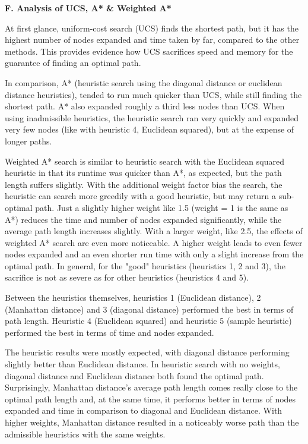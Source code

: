 \documentclass[12pt, letterpaper]{article}
\begin{document}
\medskip

\pagebreak %

\noindent \textbf{F. Analysis of UCS, A* \& Weighted A*}

At first glance, uniform-cost search (UCS) finds the shortest path, but it has the highest number of nodes expanded and time taken by far, compared to the other methods. This provides evidence how UCS sacrifices speed and memory for the guarantee of finding an optimal path.

In comparison, A* (heuristic search using the diagonal distance or euclidean distance heuristics),  tended to run much quicker than UCS, while still finding the shortest path. A* also expanded roughly a third less nodes than UCS. When using inadmissible heuristics, the heuristic search ran very quickly and expanded very few nodes (like with heuristic 4, Euclidean squared), but at the expense of longer paths.

Weighted A* search is similar to heuristic search with the Euclidean squared heuristic in that its runtime was quicker than A*, as expected, but the path length suffers slightly. With the additional weight factor bias the search, the heuristic can search more greedily with a good heuristic, but may return a sub-optimal path. Just a slightly higher weight like 1.5 (weight = 1 is the same as A*) reduces the time and number of nodes expanded significantly, while the average path length increases slightly. With a larger weight, like 2.5, the effects of weighted A* search are even more noticeable. A higher weight leads to even fewer nodes expanded and an even shorter run time with only a slight increase from the optimal path. In general, for the "good" heuristics (heuristics 1, 2 and 3), the sacrifice is not as severe as for other heuristics (heuristics 4 and 5). \newline

Between the heuristics themselves, heuristics 1 (Euclidean distance), 2 (Manhattan distance) and 3 (diagonal distance) performed the best in terms of path length. Heuristic 4 (Euclidean squared) and heuristic 5 (sample heuristic) performed the best in terms of time and nodes expanded.

The heuristic results were mostly expected, with diagonal distance performing slightly better than Euclidean distance. In heuristic search with no weights, diagonal distance and Euclidean distance both found the optimal path. Surprisingly, Manhattan distance's average path length comes really close to the optimal path length and, at the same time, it performs better in terms of nodes expanded and time in comparison to diagonal and Euclidean distance. With higher weights, Manhattan distance resulted in a noticeably worse path than the admissible heuristics with the same weights. 
\end{document}

